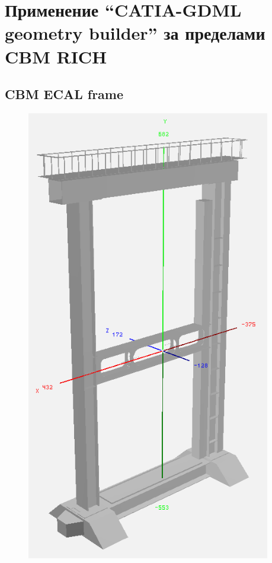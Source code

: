 \section{Применение ``CATIA-GDML geometry builder'' за пределами CBM RICH}\label{sec:secBuilderOtherUsage}

\subsection{CBM ECAL frame}


\begin{figure}[H]
\begin{minipage}[b]{0.31\textwidth}
\includegraphics[width=0.95\textwidth]{pictures/ECAL_SIS300_ROOT.png}

\end{minipage}
\end{figure}
